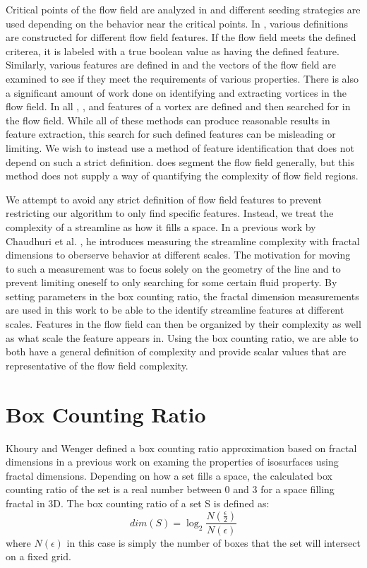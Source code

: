 \documentclass{egpubl}
\begin{document}
Critical points of the flow field are analyzed in \cite{ye} and different seeding strategies are used depending on the behavior near the critical points.
In \cite{salzbrunn}, various definitions are constructed for different flow field features.
If the flow field meets the defined criterea, it is labeled with a true boolean value as having the defined feature.
Similarly, various features are defined in \cite{heiberg} and the vectors of the flow field are examined to see if they meet the requirements of various properties.
There is also a significant amount of work done on identifying and extracting vortices in the flow field.
In all \cite{sadarjoen1999}, \cite{sadarjoen1998}, and \cite{zhong} features of a vortex are defined and then searched for in the flow field.
While all of these methods can produce reasonable results in feature extraction, this search for such defined features can be misleading or limiting.
We wish to instead use a method of feature identification that does not depend on such a strict definition.
\cite{mahrous} does segment the flow field generally, but this method does not supply a way of quantifying the complexity of flow field regions.

We attempt to avoid any strict definition of flow field features to prevent restricting our algorithm to only find specific features. Instead, we treat the complexity of a streamline as how it fills a space. In a previous work by Chaudhuri et al. \cite{chaudhuri}, he introduces measuring the streamline complexity with fractal dimensions to oberserve behavior at different scales.
The motivation for moving to such a measurement was to focus solely on the geometry of the line and to prevent limiting oneself to only searching for some certain fluid property.
By setting parameters in the box counting ratio, the fractal dimension measurements are used in this work to be able to the identify streamline features at different scales.
Features in the flow field can then be organized by their complexity as well as what scale the feature appears in.
Using the box counting ratio, we are able to both have a general definition of complexity and provide scalar values that are representative of the flow field complexity.

\section{Box Counting Ratio} \label{sec:bcr}

Khoury and Wenger \cite{khoury} defined a box counting ratio approximation based on fractal dimensions in a previous work on examing the properties of isosurfaces using fractal dimensions.
Depending on how a set fills a space, the calculated box counting ratio of the set is a real number between 0 and 3 for a space filling fractal in 3D.
The box counting ratio of a set S is defined as:
\begin{equation} dim(S) = \log_2\frac{N(\frac{\epsilon}{2})}{N(\epsilon)}\end{equation}
where $N(\epsilon)$ in this case is simply the number of boxes that the set will intersect on a fixed grid.
\end{document}
